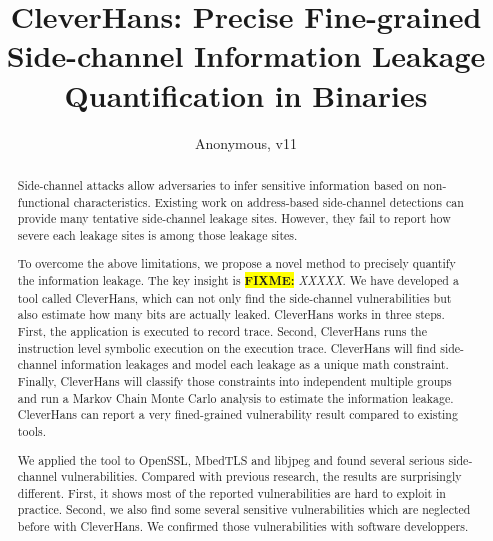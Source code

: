 \documentclass[conference]{IEEEtran}
\newcommand{\highlight}[1]{\colorbox{yellow}{\textbf{#1}}}
\newcommand{\fixme}[1]{\highlight{FIXME:} \emph{#1}}
\newcommand{\tool}{TANA}
\renewcommand{\tool}{CleverHans}
\begin{document}
\title{\tool{}: Precise Fine-grained Side-channel Information Leakage Quantification in Binaries}
\author{Anonymous, v11}

\maketitle

\begin{abstract}
    Side-channel attacks allow adversaries to infer sensitive
    information based on non-functional characteristics. 
    Existing work on address-based side-channel detections can provide 
    many tentative side-channel leakage sites. However, 
    they fail to report how severe each leakage sites is among those
    leakage sites.
       
    To overcome the above limitations, we propose a novel method
    to precisely quantify the information leakage.
    The key insight is \fixme{XXXXX}.
    We have developed a tool called \tool{}, which can not only 
    find the side-channel vulnerabilities but also estimate how many bits are actually leaked. 
    \tool{} works in three steps. First, the application is executed to record 
    trace. Second, \tool{} runs the instruction level symbolic execution on the 
    execution trace. \tool{} will find side-channel information leakages and model each leakage 
    as a unique math constraint. Finally, \tool{} will classify those constraints into 
    independent multiple groups and run a Markov Chain Monte Carlo analysis to estimate the 
    information leakage. \tool{} can report a very fined-grained vulnerability result 
    compared to existing tools.
    
    We applied the tool to OpenSSL, MbedTLS and libjpeg and found several serious side-channel 
    vulnerabilities. Compared with previous research, the results are surprisingly different. 
    First, it shows most of the reported vulnerabilities are hard to exploit in practice. 
    Second, we also find some several sensitive vulnerabilities which are neglected before with \tool{}. 
    We confirmed those vulnerabilities with software developpers.

\end{abstract}

\IEEEpeerreviewmaketitle
{}














\end{document}
